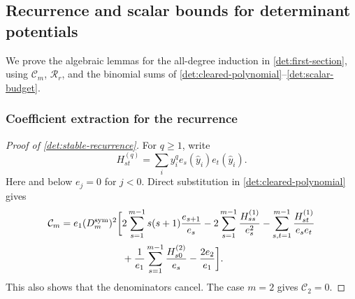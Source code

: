\subsection{Recurrence and scalar bounds for determinant potentials}
\label{app:determinant-details}

We prove the algebraic lemmas for the all-degree induction in
\cref{det:first-section}, using \(\mathcal C_m\), \(\mathcal R_r\), and
the binomial sums of
\eqref{det:cleared-polynomial}--\eqref{det:scalar-budget}.

\subsubsection*{Coefficient extraction for the recurrence}

\begin{proof}[Proof of \cref{det:stable-recurrence}]
For $q\geq1$, write
\[
 H_{st}^{(q)}=\sum_i y_i^q e_s(\widehat y_i)e_t(\widehat y_i).
\]
Here and below $e_j=0$ for $j<0$.  Direct substitution in
\eqref{det:cleared-polynomial} gives
\begin{align}
 \mathcal C_m=e_1(D_m^{\mathrm{sym}})^2\biggl[
 &2\sum_{s=1}^{m-1}s(s+1)\frac{e_{s+1}}{e_s}
 -2\sum_{s=1}^{m-1}\frac{H_{ss}^{(1)}}{e_s^2}
 -\sum_{s,t=1}^{m-1}\frac{H_{st}^{(1)}}{e_se_t}\notag\\
 &+\frac1{e_1}\sum_{s=1}^{m-1}\frac{H_{s0}^{(2)}}{e_s}
 -\frac{2e_2}{e_1}\biggr].
 \label{det:C-expanded}
\end{align}
This also shows that the denominators cancel.  The case $m=2$ gives
$\mathcal C_2=0$.


\end{proof}
